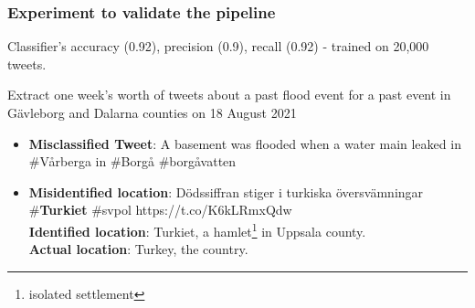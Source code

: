 \documentclass{beamer}
\begin{document}
\begin{frame}[t]
  \frametitle{Experiment to validate the pipeline}

  Classifier's accuracy (0.92), precision (0.9), recall (0.92) - trained on 20,000 tweets.

   \vspace{0.5cm}

  Extract one week's worth of tweets about a past flood event for a past event in 
  Gävleborg and Dalarna counties on 18 August 2021
\begin{itemize}
  \item \textbf{Misclassified Tweet}: A basement was flooded when a water main leaked in \#Vårberga in \#Borgå \#borgåvatten
  \item \textbf{Misidentified location}: Dödssiffran stiger i turkiska översvämningar
    \#\textbf{\alert{Turkiet}} \#svpol
    https://t.co/K6kLRmxQdw \\
    \textbf{Identified location}: Turkiet, a hamlet\footnote{isolated settlement} in Uppsala county. \\
    \textbf{Actual location}: Turkey, the country.
\end{itemize}
\end{frame}

\end{document}
